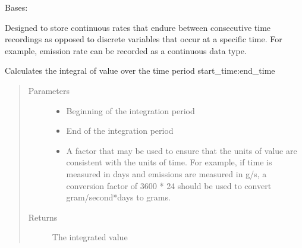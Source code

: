 \documentclass[letterpaper,10pt,english]{sphinxmanual}
\begin{document}

\begin{fulllineitems}
\label{\detokenize{index:feast.EmissionSimModules.result_classes.ResultContinuous}}
Bases: {\hyperref[\detokenize{index:feast.EmissionSimModules.result_classes.ResultAggregate}]{}}

Designed to store continuous rates that endure between consecutive time recordings as opposed to discrete
variables that occur at a specific time. For example, emission rate can be recorded as a continuous data type.

\begin{fulllineitems}
\label{\detokenize{index:feast.EmissionSimModules.result_classes.ResultContinuous.get_time_integrated}}
Calculates the integral of value over the time period start\_time:end\_time
\begin{quote}\begin{description}
\item[{Parameters}] \leavevmode\begin{itemize}
\item {} 
 \textendash{} Beginning of the integration period

\item {} 
 \textendash{} End of the integration period

\item {} 
 \textendash{} A factor that may be used to ensure that the units of value are consistent with the units of
time. For example, if time is measured in days and emissions are measured in g/s, a conversion factor of
3600 * 24 should be used to convert gram/second*days to grams.

\end{itemize}

\item[{Returns}] \leavevmode
The integrated value

\end{description}\end{quote}

\end{fulllineitems}


\end{fulllineitems}
\end{document}
